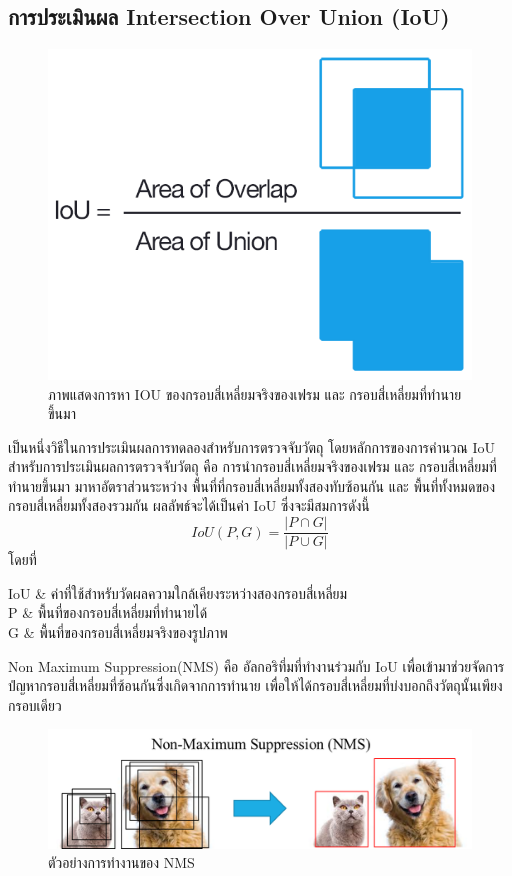 \subsection*{การประเมินผล Intersection Over Union (IoU)}
\begin{figure}[!ht]
	\centering
	\includegraphics[scale=0.3]{chapter2/images/iou_equation.png}
		\caption{ภาพแสดงการหา IOU ของกรอบสี่เหลี่ยมจริงของเฟรม และ กรอบสี่เหลี่ยมที่ทำนายขึ้นมา}
    	\label{fig:iou_equation}
\end{figure}

เป็นหนึ่งวิธีในการประเมินผลการทดลองสำหรับการตรวจจับวัตถุ โดยหลักการของการคำนวณ IoU สำหรับการประเมินผลการตรวจจับวัตถุ คือ การนำกรอบสี่เหลี่ยมจริงของเฟรม และ กรอบสี่เหลี่ยมที่ทำนายขึ้นมา มาหาอัตราส่วนระหว่าง พื้นที่ที่กรอบสี่เหลี่ยมทั้งสองทับซ้อนกัน และ พื้นที่ทั้งหมดของกรอบสี่เหลี่ยมทั้งสองรวมกัน ผลลัพธ์จะได้เป็นค่า IoU ซึ่งจะมีสมการดังนี้
\begin{equation}
IoU(P,G) = \frac{\left| P \cap G \right|}{\left| P \cup  G \right|}					
\end{equation}
โดยที่
\begin{conditions}
IoU			&  ค่าที่ใช้สำหรับวัดผลความใกล้เคียงระหว่างสองกรอบสี่เหลี่ยม    \\
P			&  พื้นที่ของกรอบสี่เหลี่ยมที่ทำนายได้	\\
G			&  พื้นที่ของกรอบสี่เหลี่ยมจริงของรูปภาพ					\\
\end{conditions}
\par Non Maximum Suppression(NMS) คือ อัลกอริทึ่มที่ทำงานร่วมกับ IoU เพื่อเข้ามาช่วยจัดการปํญหากรอบสี่เหลี่ยมที่ซ้อนกันซึ่งเกิดจากการทำนาย เพื่อให้ได้กรอบสี่เหลี่ยมที่บ่งบอกถึงวัตถุนั้นเพียงกรอบเดียว 
\begin{figure}[!ht]
	\centering
	\includegraphics[scale=0.3]{chapter2/images/NMS.png}
		\caption{ตัวอย่างการทำงานของ NMS}
    	\label{fig:NMS}
\end{figure}
